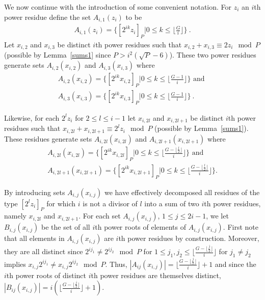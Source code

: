 We now continue with the introduction of some convenient notation.
For $z_i$ an $i$th power residue define the set $A_{i,1}(z_i)$ to
be
\begin{eqnarray}\label{azi1}A_{i,1}(z_i)=\{[2^{ik}z_i]_P | 0 \leq k \leq
\lfloor\frac{G}{i} \rfloor \}~.\end{eqnarray} Let $x_{i,2}$ and
$x_{i,3}$ be distinct $i$th power residues such that
$x_{i,2}+x_{i,3} \equiv 2z_i \mod P$ (possible by
Lemma~\ref{sums1} since $P>i^2(\sqrt{P}-6)$). These two power
residues generate sets $A_{i,2}(x_{i,2})$ and  $A_{i,3}(x_{i,3})$
where
\begin{eqnarray}\label{azi2} A_{i,2}(x_{i,2}) =\{ [2^{ik}x_{i,2}]_P| 0 \leq k \leq \lfloor
\frac{G-1}{i} \rfloor \} \text{ and }\\
\label{azi3}A_{i,3}(x_{i,3}) =\{ [2^{ik}x_{i,3}]_P| 0 \leq k \leq
\lfloor \frac{G-1}{i} \rfloor \}~.\end{eqnarray}

Likewise, for each $2^lz_i$ for $2 \leq l \leq i-1$ let $x_{i,2l}$
and $x_{i,2l+1}$ be distinct $i$th power residues such that
$x_{i,2l} + x_{i,2l+1} \equiv 2^lz_i \mod P$ (possible by
Lemma~\ref{sums1}). These residues generate sets
$A_{i,2l}(x_{i,2l})$ and  $A_{i,2l+1}(x_{i,2l+1})$ where
\begin{eqnarray}\label{azi2l}
A_{i,2l}(x_{i,2l}) =\{ [2^{ik}x_{i,2l}]_P| 0 \leq k \leq \lfloor
\frac{G-\lfloor \frac{l}{2} \rfloor}{i} \rfloor \} \text{ and }\\
\label{azi2l}A_{i,2l+1}(x_{i,2l+1}) =\{ [2^{ik}x_{i,2l+1}]_P| 0
\leq k \leq \lfloor \frac{G-\lfloor \frac{l}{2} \rfloor}{i}
\rfloor \}.\end{eqnarray}

By introducing sets $A_{i,j}(x_{i,j})$ we have effectively
decomposed all residues of the type $[2^lz_i]_P$ for which $i$ is
not a divisor of $l$ into a sum of two $i$th power residues,
namely $x_{i,2l}$ and $x_{i,2l+1}$. For each set
$A_{i,j}(x_{i,j})$, $1 \leq j \leq 2i-1$, we let
$B_{i,j}(x_{i,j})$ be the set of all $i$th power roots of elements
of $A_{i,j}(x_{i,j})$. First note that all elements in
$A_{i,j}(x_{i,j})$ are $i$th power residues by construction.
Moreover, they are all distinct since  $2^{ij_1} \neq 2^{ij_2}
\mod P$ for $1 \leq j_1,j_2 \leq \lfloor
\frac{G-\lfloor\frac{j}{2} \rfloor}{i} \rfloor$ for $j_1\neq j_2$
implies $x_{i,j}2^{ij_1} \neq x_{i,j}2^{ij_2} \mod P$. Thus,
$|A_{ij}(x_{i,j})|=\lfloor \frac{G-\lfloor \frac{j}{2}\rfloor}{i}
\rfloor+1$ and since the $i$th power roots of distinct $i$th power
residues are themselves distinct,
$|B_{ij}(x_{i,j})|=i\left(\lfloor \frac{G-\lfloor
\frac{j}{2}\rfloor}{i} \rfloor+1\right)$.



